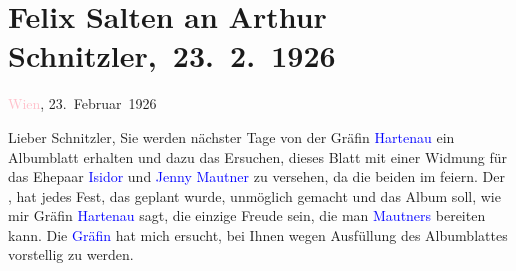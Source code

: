 

\renewcommand{\erwaehntePersonen}{Personen: Hans Breuer, Johanna von Hartenau, Isidor Mautner, Jenny Mautner, Felix Salten}
\renewcommand{\erwaehnteOrte}{Orte: Wien}
\renewcommand{\erwaehnteWerke}{}
\section[ Felix Salten an Arthur Schnitzler, 23. 2. 1926]{Felix Salten an Arthur Schnitzler, 23. 2. 1926}
\nopagebreak{}
\rehead{ }\normalsize\beginnumbering{}
\toendnotes[C]{\smallbreak\pagebreak[2]}
\toendnotes[C]{\smallbreak}
\pstart
           \raggedleft{}{\pb}\textcolor{pink}{Wien}{}\ledrightnote{\textcolor{pink}{Wien}}, 23. Februar 1926\pend
           
\pstart{}Lieber Schnitzler,\pend
\pstart
           Sie werden nächster Tage von der Gräfin \textcolor{blue}{Hartenau}{}\ledrightnote{\textcolor{blue}{Johanna von Hartenau}} ein Albumblatt erhalten und dazu das Ersuchen, dieses Blatt mit
               einer Widmung für das Ehepaar \textcolor{blue}{Isidor}{}\ledrightnote{\textcolor{blue}{Isidor Mautner}} und \textcolor{blue}{Jenny Mautner}{}\ledrightnote{\textcolor{blue}{Jenny Mautner}} zu versehen, da die beiden im
                  \label{K_L03585-1v}\label{K_L03585-1h} feiern. Der \label{K_L03585-2v}\label{K_L03585-2h}, hat jedes Fest, das geplant wurde,
               unmöglich gemacht und das Album soll, wie mir Gräfin \textcolor{blue}{Hartenau}{}\ledrightnote{\textcolor{blue}{Johanna von Hartenau}} sagt, die einzige Freude sein, die man \textcolor{blue}{Mautners}{}\ledrightnote{\textcolor{blue}{Isidor Mautner}{\newline}\textcolor{blue}{Jenny Mautner}} bereiten kann. Die \textcolor{blue}{Gräfin}{}\ledrightnote{{$\rightarrow$}\textcolor{blue}{Johanna von Hartenau}} hat mich ersucht, bei
               Ihnen wegen Ausfüllung des Albumblattes vorstellig zu werden.\pend
           
